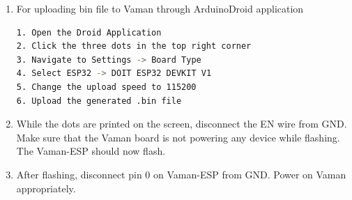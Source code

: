 \begin{enumerate}[label=\thesection.\arabic*.,ref=\thesection.\theenumi]
\begin{lstlisting}
[env:esp32doit-devkit-v1]
platform = espressif32
board = esp32doit-devkit-v1
framework = arduino
platform_packages =                                                               toolchain-xtensa-esp32@https://github.com/esphome/esphome-docker-base/releases/download/v1.4.0/toolchain-xtensa32.tar.gz                             
framework-arduinoespressif32@<3.10006.210326
\end{lstlisting}
\item For uploading bin file to Vaman through ArduinoDroid application 
\begin{lstlisting}[language=bash]
1. Open the Droid Application
2. Click the three dots in the top right corner
3. Navigate to Settings -> Board Type
4. Select ESP32 -> DOIT ESP32 DEVKIT V1
5. Change the upload speed to 115200
6. Upload the generated .bin file
\end{lstlisting}
\item While the dots are printed on the screen, disconnect the EN wire from GND.   Make sure that the Vaman board is not powering any device while flashing.  The Vaman-ESP should now flash.
\item After flashing, disconnect pin 0 on Vaman-ESP from GND. Power on Vaman appropriately.
\end{enumerate}
